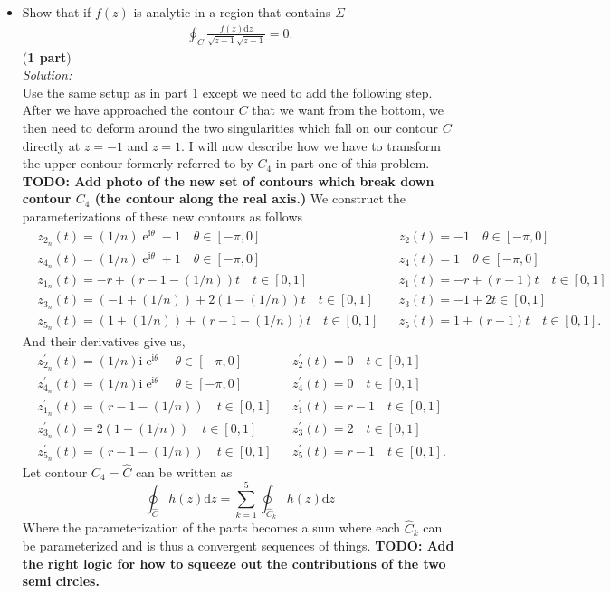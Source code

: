 \documentclass[10pt]{amsart}
\newcommand{\D}{\mathrm{d}}
\newcommand{\I}{\mathrm{i}}
\DeclareMathOperator{\E}{e}
\theoremstyle{nonumberplain}
\begin{document}
\begin{enumerate}[label={\bf {\arabic*}:}]
\begin{itemize}
  \item Show that if $f(z)$ is analytic in a region that contains $\Sigma$
    \begin{align*}
        \oint_C \frac{f(z) \D z}{\sqrt{z-1} \sqrt{z+1}}= 0.
      \end{align*}
(\textbf{1 part}) \\
\textit{Solution:} \\
Use the same setup as in part 1 except we need to add the following step.
After we have approached the contour $C$ that we want from the bottom, we then need to deform around the two singularities which fall on our contour $C$ directly at $z = -1$ and $z = 1$.
I will now describe how we have to transform the upper contour formerly referred to by $C_4$ in part one of this problem. \\

\noindent
\textbf{TODO: Add photo of the new set of contours which break down contour $C_4$ (the contour along the real axis.)}
We construct the parameterizations of these new contours as follows
\begin{align*}
&z_{2_n}(t) = (1/n) \E^{\I \theta} - 1 \quad \theta \in [-\pi, 0]& &z_2(t) = -1 \quad \theta \in [-\pi, 0]& \\
&z_{4_n}(t) = (1/n) \E^{\I \theta} + 1 \quad \theta \in [-\pi, 0]& &z_4(t) = 1 \quad \theta \in [-\pi, 0]& \\
&z_{1_n}(t) = - r + (r - 1 - (1/n)) t \quad t \in [0, 1]& &z_1(t) = - r + (r - 1) t \quad t \in [0, 1]& \\
&z_{3_n}(t) = (- 1 + (1/n)) + 2(1 - (1/n))t \quad t \in [0, 1]& &z_3(t) = -1 + 2t \in [0, 1]& \\
&z_{5_n}(t) = (1 + (1/n)) + (r - 1 - (1/n))t \quad t \in [0, 1]& &z_5(t) = 1 + (r - 1)t \quad t \in [0, 1].&
\end{align*}
And their derivatives give us,
\begin{align*}
&z_{2_n}^\prime(t) = (1/n) \I \E^{\I \theta} \quad \theta \in [-\pi, 0]& &z_2^\prime(t) = 0 \quad t \in [0, 1]& \\
&z_{4_n}^\prime(t) = (1/n) \I \E^{\I \theta} \quad \theta \in [-\pi, 0]& &z_4^\prime(t) = 0 \quad t \in [0, 1]& \\
&z_{1_n}^\prime(t) = (r - 1 - (1/n)) \quad t \in [0, 1]& &z_1^\prime(t) = r - 1 \quad t \in [0, 1]& \\
&z_{3_n}^\prime(t) = 2(1 - (1/n)) \quad t \in [0, 1]& &z_3^\prime(t) = 2 \quad t \in [0, 1]& \\
&z_{5_n}^\prime(t) = (r - 1 - (1/n)) \quad t \in [0, 1]& &z_5^\prime(t) = r - 1 \quad t \in [0, 1].&
\end{align*}
Let contour $C_4 = \widehat C$ can be written as
$$
\oint_{\widehat C} h(z) \D z = \sum_{k = 1}^5 \oint_{\widehat C_k} h(z) \D z
$$
Where the parameterization of the parts becomes a sum where each $\widehat C_k$ can be parameterized and is thus a convergent sequences of things.
\textbf{TODO: Add the right logic for how to squeeze out the contributions of the two semi circles.}
\end{itemize}
\newpage


\end{enumerate}
\end{document}
